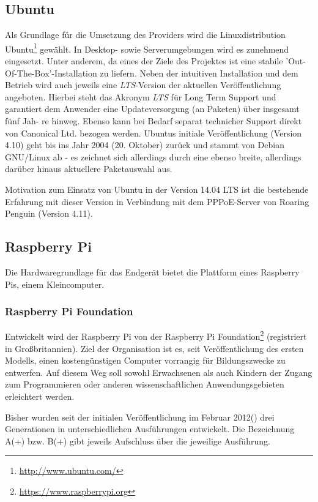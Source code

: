 \subsection{Ubuntu} %
\label{subsec:ubuntu}
Als Grundlage für die Umsetzung des Providers wird die Linuxdistribution Ubuntu\footnote{\url{http://www.ubuntu.com/}}
gewählt. In Desktop- sowie Serverumgebungen wird es zunehmend eingesetzt.
Unter anderem, da eines der Ziele des Projektes ist eine stabile
'Out-Of-The-Box'-Installation zu liefern. Neben der intuitiven Installation und dem
Betrieb wird auch jeweils eine \textit{LTS}-Version der aktuellen Veröffentlichung angeboten.
Hierbei steht das Akronym \textit{LTS} für Long Term Support und garantiert dem Anwender eine
Updateversorgung (an Paketen) über insgesamt fünf Jah-
re hinweg. Ebenso kann bei Bedarf separat technicher Support direkt von Canonical
Ltd. bezogen werden. Ubuntus initiale Veröffentlichung (Version 4.10) geht bis ins Jahr
2004 (20. Oktober) zurück und stammt von Debian GNU/Linux ab - es zeichnet sich
allerdings durch eine ebenso breite, allerdings darüber hinaus aktuellere Paketauswahl aus.

Motivation zum Einsatz von Ubuntu in der Version 14.04 LTS ist die bestehende Erfahrung
mit dieser Version in Verbindung mit dem PPPoE-Server von Roaring Penguin (Version 4.11).

\subsection{Raspberry Pi}

Die Hardwaregrundlage für das Endgerät bietet die Plattform eines Raspberry Pis, einem Kleincomputer.

\subsubsection{Raspberry Pi Foundation}
Entwickelt wird der Raspberry Pi von der Raspberry Pi Foundation\footnote{\url{https://www.raspberrypi.org}}
(registriert in Großbritannien). Ziel der Organisation ist es,
seit Veröffentlichung des ersten Modells, einen kostengünstigen
Computer vorrangig für Bildungszwecke zu entwerfen. Auf diesem
Weg soll sowohl Erwachsenen als auch Kindern der Zugang zum
Programmieren oder anderen wissenschaftlichen Anwendungsgebieten
erleichtert werden.

Bisher wurden seit der initialen Veröffentlichung im Februar 2012(\cite{rasppifoundweb})
drei Generationen in unterschiedlichen Ausführungen
entwickelt. Die Bezeichnung A(+) bzw. B(+) gibt jeweils Aufschluss
über die jeweilige Ausführung.

